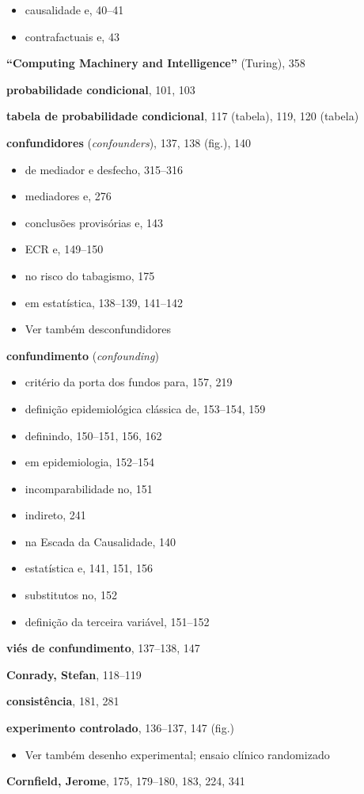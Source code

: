 \documentclass[11pt,a5paper,twoside]{book}
\begin{document}
\begin{itemize}
\item causalidade e, 40–41
\item contrafactuais e, 43
\end{itemize}
\textbf{“Computing Machinery and Intelligence”} (Turing), 358

\textbf{probabilidade condicional}, 101, 103

\textbf{tabela de probabilidade condicional}, 117 (tabela), 119, 120 (tabela)

\textbf{confundidores} (\textit{confounders}), 137, 138 (fig.), 140

\begin{itemize}
\item de mediador e desfecho, 315–316
\item mediadores e, 276
\item conclusões provisórias e, 143
\item ECR e, 149–150
\item no risco do tabagismo, 175
\item em estatística, 138–139, 141–142
\item Ver também desconfundidores
\end{itemize}
\textbf{confundimento} (\textit{confounding})

\begin{itemize}
\item critério da porta dos fundos para, 157, 219
\item definição epidemiológica clássica de, 153–154, 159
\item definindo, 150–151, 156, 162
\item em epidemiologia, 152–154
\item incomparabilidade no, 151
\item indireto, 241
\item na Escada da Causalidade, 140
\item estatística e, 141, 151, 156
\item substitutos no, 152
\item definição da terceira variável, 151–152
\end{itemize}
\textbf{viés de confundimento}, 137–138, 147

\textbf{Conrady, Stefan}, 118–119

\textbf{consistência}, 181, 281

\textbf{experimento controlado}, 136–137, 147 (fig.)

\begin{itemize}
\item Ver também desenho experimental; ensaio clínico randomizado
\end{itemize}
\textbf{Cornfield, Jerome}, 175, 179–180, 183, 224, 341
\end{document}

